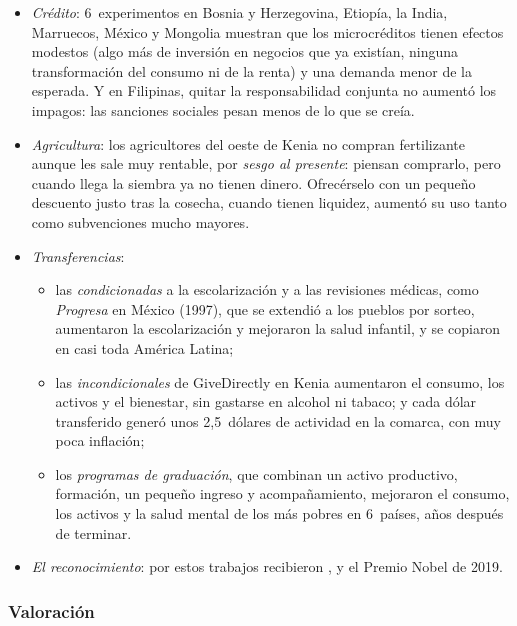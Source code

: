 \documentclass[11pt]{article}
\begin{document}
\begin{itemize}
\begin{itemize}
  \end{itemize}
\item \emph{Crédito}: 6~experimentos en Bosnia y Herzegovina, Etiopía, la India, Marruecos, México y Mongolia muestran que los microcréditos tienen efectos modestos (algo más de inversión en negocios que ya existían, ninguna transformación del consumo ni de la renta) y una demanda menor de la esperada\nocite{BanerjeeKarlanZinman2015}. Y en Filipinas, quitar la responsabilidad conjunta no aumentó los impagos\nocite{GineKarlan2014}: las sanciones sociales pesan menos de lo que se creía.
\item \emph{Agricultura}: los agricultores del oeste de Kenia no compran fertilizante aunque les sale muy rentable, por \emph{sesgo al presente}: piensan comprarlo, pero cuando llega la siembra ya no tienen dinero. Ofrecérselo con un pequeño descuento justo tras la cosecha, cuando tienen liquidez, aumentó su uso tanto como subvenciones mucho mayores\nocite{DufloKremerRobinson2011}.
\item \emph{Transferencias}:
  \begin{itemize}
  \item las \emph{condicionadas} a la escolarización y a las revisiones médicas, como \emph{Progresa} en México (1997), que se extendió a los pueblos por sorteo, aumentaron la escolarización y mejoraron la salud infantil\nocite{Schultz2004}, y se copiaron en casi toda América Latina;
  \item las \emph{incondicionales} de GiveDirectly en Kenia aumentaron el consumo, los activos y el bienestar, sin gastarse en alcohol ni tabaco\nocite{HaushoferShapiro2016}; y cada dólar transferido generó unos 2,5~dólares de actividad en la comarca, con muy poca inflación\nocite{EggerEtAl2022};
  \item los \emph{programas de graduación}, que combinan un activo productivo, formación, un pequeño ingreso y acompañamiento, mejoraron el consumo, los activos y la salud mental de los más pobres en 6~países, años después de terminar\nocite{BanerjeeEtAl2015Graduacion}.
  \end{itemize}
\item \emph{El reconocimiento}: por estos trabajos recibieron ,  y  el Premio Nobel de 2019\nocite{NobelPrize2019}.
\end{itemize}

\subsubsection{Valoración}\label{sec:valoracion-rct}
\end{document}
